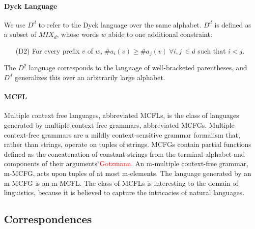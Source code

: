 \documentclass[nonatbib,numbers,10pt]{sigplanconf}
\newcommand\todo[1]{\textcolor{red}{#1}}
\begin{document}
\paragraph{Dyck Language}
We use $D^d$ to refer to the Dyck language over the same alphabet. $D^d$ is defined as a subset of $MIX_d$, whose words $w$ abide to one additional constraint:
\begin{itemize}
\item[(D2)] For every prefix $v$ of $w$, $ \#a_i(v) \geq \#a_j(v) \ \forall i, j \ \in d$ such that $i < j$.
\end{itemize}

The $D^2$ language corresponds to the language of well-bracketed parentheses, and $D^d$ generalizes this over an arbitrarily large alphabet.
\paragraph{MCFL}
Multiple context free languages, abbreviated MCFLs, is the class of languages generated by multiple context free grammars, abbreviated MCFGs. Multiple context-free grammars are a mildly context-sensitive grammar formalism that, rather than strings, operate on tuples of strings. MCFGs contain partial functions defined as the concatenation of constant strings from the terminal alphabet and components of their arguments \todo{̈Gotzmann}. An m-multiple context-free grammar, m-MCFG, acts upon tuples of at most m-elements. The language generated by an m-MCFG is an m-MCFL. The class of MCFLs is interesting to the domain of linguistics, because it is believed to capture the intricacies of natural languages. 

\subsection{Correspondences}
%
\end{document}
